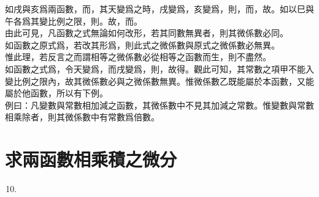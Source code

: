 \begin{enumerate} [label={第\chinese*款}]
    如戌與亥爲兩函數，而\CJKmove，其天變爲\CJKmove 之時，戌變爲\CJKmove，亥變爲\CJKmove，則\CJKmove，而\CJKmove，故\CJKmove。如以巳與午各爲其變比例之限，則\CJKmove。故\CJKmove，而\CJKmove。\\
    由此可見，凡函數之式無論如何改形，若其同數無異者，則其微係數必同。\\
    如函數之原式爲\CJKmove，若改其形爲\CJKmove，則此式之微係數與原式之微係數必無異。\\
    惟此理，若反言之而謂相等之微係數必從相等之函數而生，則不盡然。\\
    如函數之式爲\CJKmove，令天變爲\CJKmove，而戌變爲\CJKmove，則\CJKmove，故得\CJKmove。觀此可知，其常數之項甲不能入變比例之限內，故其微係數必與\CJKmove 之微係數無異。惟微係數乙既能屬於本函數\CJKmove，又能屬於他函數\CJKmove，所以有下例。\\
    例曰：凡變數與常數相加減之函數，其微係數中不見其加減之常數。惟變數與常數相乘除者，則其微係數中有常數爲倍數。
\end{enumerate}

\section{求兩函數相乘積之微分}

\begin{enumerate} [label={第\chinese*款}]
	\setcounter{enumi}{9}
	\item 
\end{enumerate}